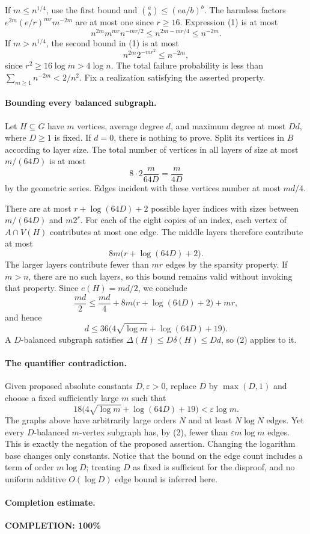 If \(m\leq n^{1/4}\), use the first bound and
\(\binom ab\leq(ea/b)^b\).
The harmless factors \(e^{2m}(e/r)^{mr}m^{-2m}\)
are at most one since \(r\geq16\). Expression (1) is at most
\[
 n^{2m}m^{mr}n^{-mr/2}
 \leq n^{2m-mr/4}\leq n^{-2m}.
\]
If \(m>n^{1/4}\), the second bound in (1) is at most
\[
 n^{2m}2^{-mr^2}\leq n^{-2m},
\]
since \(r^2\geq16\log m>4\log n\).
The total failure probability is less than
\(\sum_{m\geq1}n^{-2m}<2/n^2\).
Fix a realization satisfying the asserted property.

\paragraph{Bounding every balanced subgraph.}
Let \(H\subseteq G\) have \(m\) vertices, average degree \(d\),
and maximum degree at most \(Dd\), where \(D\geq1\) is fixed.
If \(d=0\), there is nothing to prove.
Split its vertices in \(B\) according to layer size.
The total number of vertices in all layers of size at most
\(m/(64D)\) is at most
\[
 8\cdot2\frac{m}{64D}=\frac{m}{4D}
\]
by the geometric series. Edges incident with these vertices
number at most \(md/4\).

There are at most \(r+\log(64D)+2\) possible layer indices
with sizes between \(m/(64D)\) and \(m2^r\).
For each of the eight copies of an index, each vertex of
\(A\cap V(H)\) contributes at most one edge.
The middle layers therefore contribute at most
\[
 8m\bigl(r+\log(64D)+2\bigr).
\]
The larger layers contribute fewer than \(mr\) edges by
the sparsity property. If \(m>n\), there are no such layers,
so this bound remains valid without invoking that property.
Since \(e(H)=md/2\), we conclude
\[
 \frac{md}{2}\leq\frac{md}{4}
       +8m\bigl(r+\log(64D)+2\bigr)+mr,
\]
and hence
\[
 d\leq36\bigl(4\sqrt{\log m}+\log(64D)+19\bigr).                \tag{2}
\]
A \(D\)-balanced subgraph satisfies
\(\Delta(H)\leq D\delta(H)\leq Dd\), so (2) applies to it.

\paragraph{The quantifier contradiction.}
Given proposed absolute constants \(D,\varepsilon>0\),
replace \(D\) by \(\max(D,1)\) and choose a fixed sufficiently
large \(m\) such that
\[
 18\bigl(4\sqrt{\log m}+\log(64D)+19\bigr)<\varepsilon\log m.
\]
The graphs above have arbitrarily large orders \(N\) and
at least \(N\log N\) edges. Yet every \(D\)-balanced
\(m\)-vertex subgraph has, by (2), fewer than
\(\varepsilon m\log m\) edges.
This is exactly the negation of the proposed assertion.
Changing the logarithm base changes only constants.
Notice that the bound on the edge count includes a term
of order \(m\log D\); treating \(D\) as fixed is sufficient
for the disproof, and no uniform additive \(O(\log D)\)
edge bound is inferred here.

\paragraph{Completion estimate.}
\textbf{COMPLETION: 100\%}
